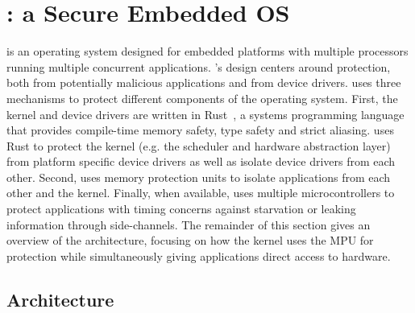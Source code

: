 \section{\name: a Secure Embedded OS}
\label{sec:os}

\name is an operating system  designed for embedded platforms
with multiple processors running multiple concurrent applications.
\name's design centers around protection, both from potentially
malicious applications and from device drivers. \name uses three
mechanisms to protect different components of the operating
system. First, the kernel and device drivers are written in Rust~\cite{rust}, 
a systems programming language that provides compile-time memory safety, 
type safety and
strict aliasing. \name uses Rust to protect the kernel (e.g. the
scheduler and hardware abstraction layer) from platform specific
device drivers as well as isolate device drivers from each other. 
Second, \name uses memory protection units
 to isolate applications from each other and
the kernel. Finally, when available, \name uses multiple microcontrollers to
protect applications with timing concerns against starvation or leaking
information through side-channels. The remainder of this section gives an
overview of the \name architecture, focusing on how the kernel uses the
MPU for protection while simultaneously giving applications direct access
to hardware.

\subsection{Architecture}
\label{sec:os-arch}

